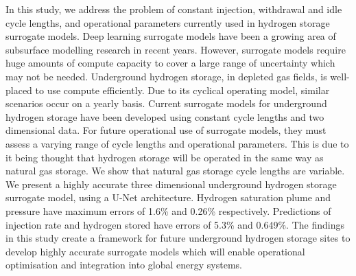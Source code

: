 In this study, we address the problem of constant injection, withdrawal and idle cycle lengths, and operational parameters currently used in hydrogen storage surrogate models. Deep learning surrogate models have been a growing area of subsurface modelling research in recent years. However, surrogate models require huge amounts of compute capacity to cover a large range of uncertainty which may not be needed. Underground hydrogen storage, in depleted gas fields, is well-placed to use compute efficiently. Due to its cyclical operating model, similar scenarios occur on a yearly basis. Current surrogate models for underground hydrogen storage have been developed using constant cycle lengths and two dimensional data. For future operational use of surrogate models, they must assess a varying range of cycle lengths and operational parameters. This is due to it being thought that hydrogen storage will be operated in the same way as natural gas storage. We show that natural gas storage cycle lengths are variable. We present a highly accurate three dimensional underground hydrogen storage surrogate model, using a U-Net architecture. Hydrogen saturation plume and pressure have maximum errors of 1.6\% and 0.26\% respectively. Predictions of injection rate and hydrogen stored have errors of 5.3\% and 0.649\%. The findings in this study create a framework for future underground hydrogen storage sites to develop highly accurate surrogate models which will enable operational optimisation and integration into global energy systems. 